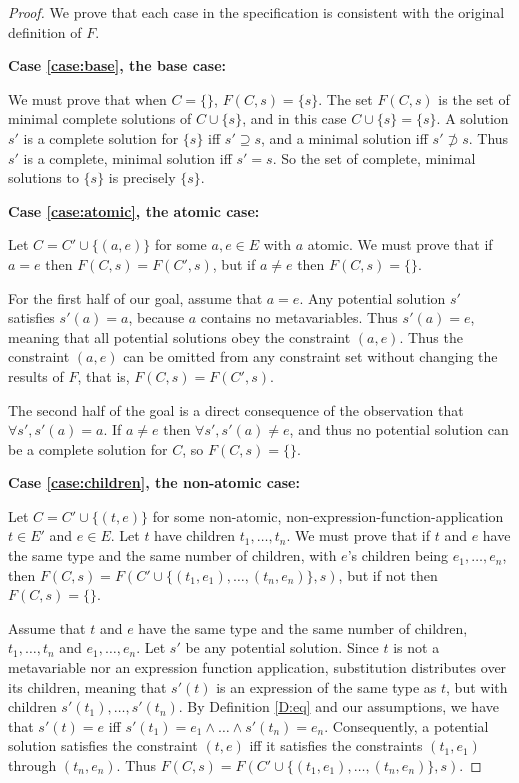 \documentclass{article}
\begin{document}
\begin{proof}
We prove that each case in the specification is consistent with the original definition of $F$.

{\bf Case \ref{case:base}, the base case:}

We must prove that when $C=\{\}$, $F(C,s)=\{s\}$.  The set $F(C,s)$ is the set of minimal complete solutions of $C\cup\{s\}$, and in this case $C\cup\{s\}=\{s\}$.  A solution $s'$ is a complete solution for $\{s\}$ iff $s'\supseteq s$, and a minimal solution iff $s'\not\supset s$.  Thus $s'$ is a complete, minimal solution iff $s'=s$.  So the set of complete, minimal solutions to $\{s\}$ is precisely $\{s\}$.

{\bf Case \ref{case:atomic}, the atomic case:}

Let $C=C'\cup\{(a,e)\}$ for some $a,e\in E$ with $a$ atomic.  We must prove that if $a=e$ then $F(C,s)=F(C',s)$, but if $a\neq e$ then $F(C,s)=\{\}$.

For the first half of our goal, assume that $a=e$.  Any potential solution $s'$ satisfies $s'(a)=a$, because $a$ contains no metavariables.  Thus $s'(a)=e$, meaning that all potential solutions obey the constraint $(a,e)$.  Thus the constraint $(a,e)$ can be omitted from any constraint set without changing the results of $F$, that is, $F(C,s)=F(C',s)$.

The second half of the goal is a direct consequence of the observation that $\forall s', s'(a)=a$.  If $a\neq e$ then $\forall s', s'(a)\neq e$, and thus no potential solution can be a complete solution for $C$, so $F(C,s)=\{\}$.

{\bf Case \ref{case:children}, the non-atomic case:}

Let $C=C'\cup\{(t,e)\}$ for some non-atomic, non-expression-function-application $t\in E'$ and $e\in E$.  Let $t$ have children $t_1,\ldots,t_n$.  We must prove that if $t$ and $e$ have the same type and the same number of children, with $e$'s children being $e_1,\ldots,e_n$, then $F(C,s)=F(C'\cup\{(t_1,e_1),\ldots,(t_n,e_n)\},s)$, but if not then $F(C,s)=\{\}$.

Assume that $t$ and $e$ have the same type and the same number of children, $t_1,\ldots,t_n$ and $e_1,\ldots,e_n$.  Let $s'$ be any potential solution.  Since $t$ is not a metavariable nor an expression function application, substitution distributes over its children, meaning that $s'(t)$ is an expression of the same type as $t$, but with children $s'(t_1),\ldots,s'(t_n)$.  By Definition \ref{D:eq} and our assumptions, we have that $s'(t)=e$ iff $s'(t_1)=e_1\wedge\ldots\wedge s'(t_n)=e_n$.  Consequently, a potential solution satisfies the constraint $(t,e)$ iff it satisfies the constraints $(t_1,e_1)$ through $(t_n,e_n)$.  Thus $F(C,s)=F(C'\cup\{(t_1,e_1),\ldots,(t_n,e_n)\},s)$.


\end{proof}
\end{document}
